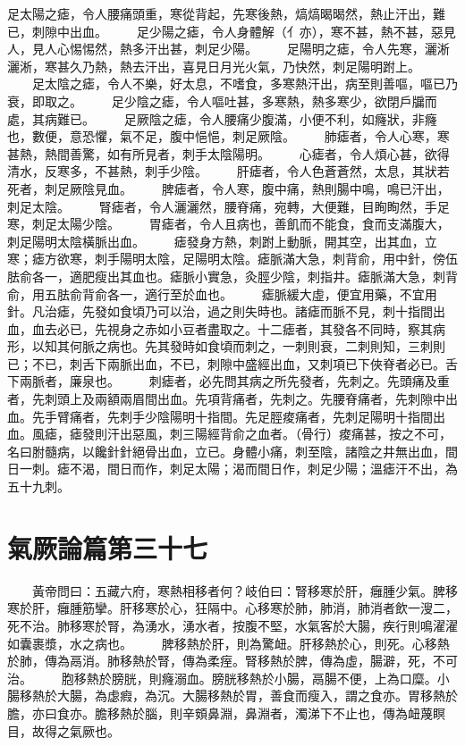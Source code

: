 足太陽之瘧，令人腰痛頭重，寒從背起，先寒後熱，熇熇暍暍然，熱止汗出，難已，刺隙中出血。
　　足少陽之瘧，令人身體解（亻亦），寒不甚，熱不甚，惡見人，見人心惕惕然，熱多汗出甚，刺足少陽。
　　足陽明之瘧，令人先寒，灑淅灑淅，寒甚久乃熱，熱去汗出，喜見日月光火氣，乃快然，刺足陽明跗上。
　　足太陰之瘧，令人不樂，好太息，不嗜食，多寒熱汗出，病至則善嘔，嘔已乃衰，即取之。
　　足少陰之瘧，令人嘔吐甚，多寒熱，熱多寒少，欲閉戶牖而處，其病難已。
　　足厥陰之瘧，令人腰痛少腹滿，小便不利，如癃狀，非癃也，數便，意恐懼，氣不足，腹中悒悒，刺足厥陰。
　　肺瘧者，令人心寒，寒甚熱，熱間善驚，如有所見者，刺手太陰陽明。
　　心瘧者，令人煩心甚，欲得清水，反寒多，不甚熱，刺手少陰。
　　肝瘧者，令人色蒼蒼然，太息，其狀若死者，刺足厥陰見血。
　　脾瘧者，令人寒，腹中痛，熱則腸中鳴，鳴已汗出，刺足太陰。
　　腎瘧者，令人灑灑然，腰脊痛，宛轉，大便難，目眴眴然，手足寒，刺足太陽少陰。
　　胃瘧者，令人且病也，善飢而不能食，食而支滿腹大，刺足陽明太陰橫脈出血。
　　瘧發身方熱，刺跗上動脈，開其空，出其血，立寒；瘧方欲寒，刺手陽明太陰，足陽明太陰。瘧脈滿大急，刺背俞，用中針，傍伍胠俞各一，適肥瘦出其血也。瘧脈小實急，灸脛少陰，刺指井。瘧脈滿大急，刺背俞，用五胠俞背俞各一，適行至於血也。
　　瘧脈緩大虛，便宜用藥，不宜用針。凡治瘧，先發如食頃乃可以治，過之則失時也。諸瘧而脈不見，刺十指間出血，血去必已，先視身之赤如小豆者盡取之。十二瘧者，其發各不同時，察其病形，以知其何脈之病也。先其發時如食頃而刺之，一刺則衰，二刺則知，三刺則已；不已，刺舌下兩脈出血，不已，刺隙中盛經出血，又刺項已下俠脊者必已。舌下兩脈者，廉泉也。
　　刺瘧者，必先問其病之所先發者，先刺之。先頭痛及重者，先刺頭上及兩額兩眉間出血。先項背痛者，先刺之。先腰脊痛者，先刺隙中出血。先手臂痛者，先刺手少陰陽明十指間。先足脛痠痛者，先刺足陽明十指間出血。風瘧，瘧發則汗出惡風，刺三陽經背俞之血者。（骨行）痠痛甚，按之不可，名曰胕髓病，以饞針針絕骨出血，立已。身體小痛，刺至陰，諸陰之井無出血，間日一刺。瘧不渴，間日而作，刺足太陽；渴而間日作，刺足少陽；溫瘧汗不出，為五十九刺。

\section{氣厥論篇第三十七}

　　黃帝問曰：五藏六府，寒熱相移者何？岐伯曰：腎移寒於肝，癰腫少氣。脾移寒於肝，癰腫筋攣。肝移寒於心，狂隔中。心移寒於肺，肺消，肺消者飲一溲二，死不治。肺移寒於腎，為湧水，湧水者，按腹不堅，水氣客於大腸，疾行則鳴濯濯如囊裹漿，水之病也。
　　脾移熱於肝，則為驚衄。肝移熱於心，則死。心移熱於肺，傳為鬲消。肺移熱於腎，傳為柔痓。腎移熱於脾，傳為虛，腸澼，死，不可治。
　　胞移熱於膀胱，則癃溺血。膀胱移熱於小腸，鬲腸不便，上為口糜。小腸移熱於大腸，為虙瘕，為沉。大腸移熱於胃，善食而瘦入，謂之食亦。胃移熱於膽，亦曰食亦。膽移熱於腦，則辛頞鼻淵，鼻淵者，濁涕下不止也，傳為衄蔑瞑目，故得之氣厥也。


